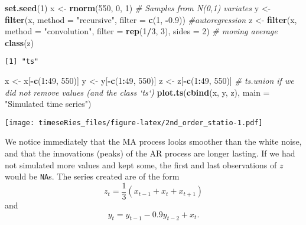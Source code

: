 \documentclass[]{book}
\newenvironment{Shaded}{\begin{snugshade}}{\end{snugshade}}
\newcommand{\KeywordTok}[1]{\textcolor[rgb]{0.13,0.29,0.53}{\textbf{#1}}}
\newcommand{\DataTypeTok}[1]{\textcolor[rgb]{0.13,0.29,0.53}{#1}}
\newcommand{\DecValTok}[1]{\textcolor[rgb]{0.00,0.00,0.81}{#1}}
\newcommand{\FloatTok}[1]{\textcolor[rgb]{0.00,0.00,0.81}{#1}}
\newcommand{\StringTok}[1]{\textcolor[rgb]{0.31,0.60,0.02}{#1}}
\newcommand{\CommentTok}[1]{\textcolor[rgb]{0.56,0.35,0.01}{\textit{#1}}}
\newcommand{\OperatorTok}[1]{\textcolor[rgb]{0.81,0.36,0.00}{\textbf{#1}}}
\newcommand{\NormalTok}[1]{#1}
\begin{document}
\begin{Shaded}
\begin{Highlighting}[]
\KeywordTok{set.seed}\NormalTok{(}\DecValTok{1}\NormalTok{)}
\NormalTok{x <-}\StringTok{ }\KeywordTok{rnorm}\NormalTok{(}\DecValTok{550}\NormalTok{, }\DecValTok{0}\NormalTok{, }\DecValTok{1}\NormalTok{)  }\CommentTok{# Samples from N(0,1) variates}
\NormalTok{y <-}\StringTok{ }\KeywordTok{filter}\NormalTok{(x, }\DataTypeTok{method =} \StringTok{"recursive"}\NormalTok{, }\DataTypeTok{filter =} \KeywordTok{c}\NormalTok{(}\DecValTok{1}\NormalTok{, }\OperatorTok{-}\FloatTok{0.9}\NormalTok{))  }\CommentTok{#autoregression}
\NormalTok{z <-}\StringTok{ }\KeywordTok{filter}\NormalTok{(x, }\DataTypeTok{method =} \StringTok{"convolution"}\NormalTok{, }\DataTypeTok{filter =} \KeywordTok{rep}\NormalTok{(}\DecValTok{1}\OperatorTok{/}\DecValTok{3}\NormalTok{, }\DecValTok{3}\NormalTok{), }\DataTypeTok{sides =} \DecValTok{2}\NormalTok{)  }\CommentTok{# moving average}
\KeywordTok{class}\NormalTok{(z)}
\end{Highlighting}
\end{Shaded}

\begin{verbatim}
[1] "ts"
\end{verbatim}

\begin{Shaded}
\begin{Highlighting}[]
\NormalTok{x <-}\StringTok{ }\NormalTok{x[}\OperatorTok{-}\KeywordTok{c}\NormalTok{(}\DecValTok{1}\OperatorTok{:}\DecValTok{49}\NormalTok{, }\DecValTok{550}\NormalTok{)]}
\NormalTok{y <-}\StringTok{ }\NormalTok{y[}\OperatorTok{-}\KeywordTok{c}\NormalTok{(}\DecValTok{1}\OperatorTok{:}\DecValTok{49}\NormalTok{, }\DecValTok{550}\NormalTok{)]}
\NormalTok{z <-}\StringTok{ }\NormalTok{z[}\OperatorTok{-}\KeywordTok{c}\NormalTok{(}\DecValTok{1}\OperatorTok{:}\DecValTok{49}\NormalTok{, }\DecValTok{550}\NormalTok{)]}
\CommentTok{# ts.union if we did not remove values (and the class `ts`)}
\KeywordTok{plot.ts}\NormalTok{(}\KeywordTok{cbind}\NormalTok{(x, y, z), }\DataTypeTok{main =} \StringTok{"Simulated time series"}\NormalTok{)}
\end{Highlighting}
\end{Shaded}

\texttt{[image: timeseRies\_files/figure-latex/2nd\_order\_statio-1.pdf]}

We notice immediately that the MA process looks smoother than the white
noise, and that the innovations (peaks) of the AR process are longer
lasting. If we had not simulated more values and kept some, the first
and last observations of \(z\) would be \texttt{NA}s. The series created
are of the form \[ z_t=\frac{1}{3}(x_{t-1}+x_{t}+x_{t+1})\] and
\[ y_t= y_{t-1}-0.9y_{t-2}+x_t.\]
\end{document}
